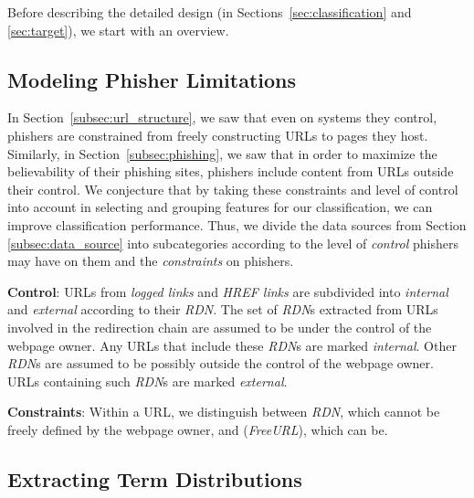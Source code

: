 \documentclass[10pt,conference,compsocconf,letterpaper]{IEEEtran}
\begin{document}
\iffeateval
Before describing the detailed design (in Sections~\ref{sec:classification} and \ref{sec:target}), we start with an overview.
\fi


\subsection{Modeling Phisher Limitations}
\label{subsec:phisher_limitation}

In Section~\ref{subsec:url_structure}, we saw that even on systems they control, phishers are constrained from freely constructing URLs to pages they host. Similarly, in Section~\ref{subsec:phishing}, we saw that in order to maximize the believability of their phishing sites, phishers include content from URLs outside their control. 
\iffullversion
We conjecture that by taking these constraints and level of control into account in selecting and grouping features for our classification, we can improve classification performance.
\fi
Thus, we divide the data sources from Section \ref{subsec:data_source} into subcategories according to the level of \textit{control} phishers may have on them and the \textit{constraints} on phishers.

\noindent\textbf{Control}: URLs from \textit{logged links} and \textit{HREF links} are subdivided into \textit{internal} and \textit{external} according to their \textit{RDN}.
The set of \textit{RDN}s extracted from URLs involved in the redirection chain are assumed to be under the control of the webpage owner. Any URLs that include these \textit{RDN}s are marked \textit{internal}. Other \textit{RDN}s are assumed to be possibly outside the control of the webpage owner. URLs containing such \textit{RDN}s are marked \textit{external}.

\noindent\textbf{Constraints}:
Within a URL, we distinguish between \textit{RDN}, which cannot be freely defined by the webpage owner, and (\textit{FreeURL}), which can be.


\subsection{Extracting Term Distributions}
\label{subsec:labels_set}
\end{document}

